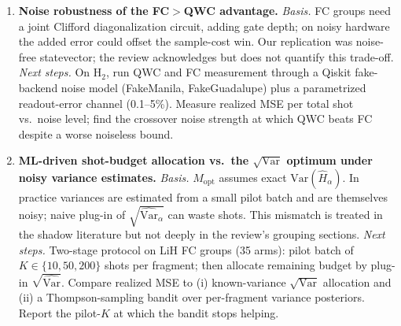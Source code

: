 \begin{enumerate}
\item \textbf{Noise robustness of the FC$>$QWC advantage.}
  \emph{Basis.} FC groups need a joint Clifford diagonalization circuit,
  adding gate depth; on noisy hardware the added error could offset the
  sample-cost win. Our replication was noise-free statevector; the review
  acknowledges but does not quantify this trade-off.
  \emph{Next steps.} On H$_2$, run QWC and FC measurement through a
  Qiskit fake-backend noise model (FakeManila, FakeGuadalupe) plus a
  parametrized readout-error channel (0.1--5\%). Measure realized MSE per
  total shot vs.\ noise level; find the crossover noise strength at which
  QWC beats FC despite a worse noiseless bound.

\item \textbf{ML-driven shot-budget allocation vs.\ the $\sqrt{\text{Var}}$
  optimum under noisy variance estimates.}
  \emph{Basis.} $M_{\mathrm{opt}}$ assumes exact $\mathrm{Var}(\hat H_\alpha)$.
  In practice variances are estimated from a small pilot batch and are
  themselves noisy; naive plug-in of $\sqrt{\widehat{\text{Var}}_\alpha}$ can
  waste shots. This mismatch is treated in the shadow literature but not
  deeply in the review's grouping sections.
  \emph{Next steps.} Two-stage protocol on LiH FC groups (35 arms): pilot
  batch of $K \in \{10, 50, 200\}$ shots per fragment; then allocate
  remaining budget by plug-in $\sqrt{\widehat{\text{Var}}}$. Compare realized
  MSE to (i) known-variance $\sqrt{\text{Var}}$ allocation and (ii) a
  Thompson-sampling bandit over per-fragment variance posteriors. Report
  the pilot-$K$ at which the bandit stops helping.
\end{enumerate}

